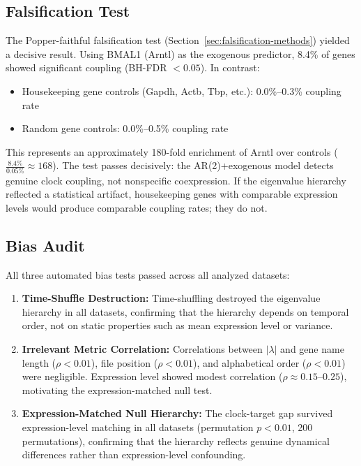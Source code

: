 \documentclass[11pt,letterpaper]{article}
\begin{document}
\subsection{Falsification Test}
\label{sec:falsification-results}

The Popper-faithful falsification test (Section~\ref{sec:falsification-methods}) yielded a decisive result. Using BMAL1 (Arntl) as the exogenous predictor, 8.4\% of genes showed significant coupling (BH-FDR $< 0.05$). In contrast:
\begin{itemize}
\item Housekeeping gene controls (Gapdh, Actb, Tbp, etc.): 0.0\%--0.3\% coupling rate
\item Random gene controls: 0.0\%--0.5\% coupling rate
\end{itemize}

This represents an approximately 180-fold enrichment of Arntl over controls ($\frac{8.4\%}{0.05\%} \approx 168$). The test passes decisively: the AR(2)+exogenous model detects genuine clock coupling, not nonspecific coexpression. If the eigenvalue hierarchy reflected a statistical artifact, housekeeping genes with comparable expression levels would produce comparable coupling rates; they do not.

\subsection{Bias Audit}
\label{sec:bias-results}

All three automated bias tests passed across all analyzed datasets:

\begin{enumerate}
\item \textbf{Time-Shuffle Destruction:} Time-shuffling destroyed the eigenvalue hierarchy in all datasets, confirming that the hierarchy depends on temporal order, not on static properties such as mean expression level or variance.

\item \textbf{Irrelevant Metric Correlation:} Correlations between $|\lambda|$ and gene name length ($\rho < 0.01$), file position ($\rho < 0.01$), and alphabetical order ($\rho < 0.01$) were negligible. Expression level showed modest correlation ($\rho \approx 0.15$--$0.25$), motivating the expression-matched null test.

\item \textbf{Expression-Matched Null Hierarchy:} The clock-target gap survived expression-level matching in all datasets (permutation $p < 0.01$, 200 permutations), confirming that the hierarchy reflects genuine dynamical differences rather than expression-level confounding.
\end{enumerate}
\end{document}
